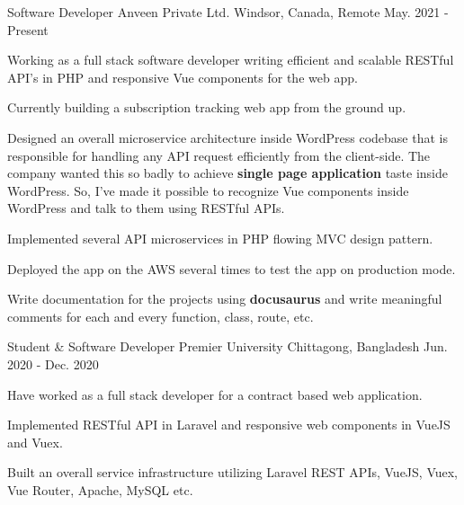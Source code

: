 


\begin{cventries}

  \cventry
    {Software Developer} %
    {Anveen Private Ltd.} %
    {Windsor, Canada, Remote} %
    {May. 2021 - Present} %
    {
      \begin{cvitems} %
        \item {Working as a full stack software developer writing efficient and scalable RESTful API's in PHP and responsive Vue components for the web app.}
        \item {Currently building a subscription tracking web app from the ground up. }
        \item {Designed an overall microservice architecture inside WordPress codebase that is responsible for handling any API request efficiently from the client-side. The company wanted this so badly to achieve \textbf{single page application} taste inside WordPress. So, I've made it possible to recognize Vue components inside WordPress and talk to them using RESTful APIs.}
        \item {Implemented several API microservices in PHP flowing MVC design pattern.}
        \item {Deployed the app on the AWS several times to test the app on production mode.}
         \item {Write documentation for the projects using \textbf{docusaurus}  and write meaningful comments for each and every function, class, route, etc. }
      \end{cvitems}
    }

  \cventry
    {Student \& Software Developer} %
    {Premier University} %
    {Chittagong, Bangladesh} %
    {Jun. 2020 - Dec. 2020} %
    {
      \begin{cvitems} %
       \item {Have worked as a full stack developer for a contract based web application. }
        \item {Implemented RESTful API in Laravel and responsive web components in VueJS and Vuex. }
        \item {Built an overall service infrastructure utilizing Laravel REST APIs, VueJS, Vuex, Vue Router, Apache, MySQL etc.}
      \end{cvitems}
    }


\end{cventries}

